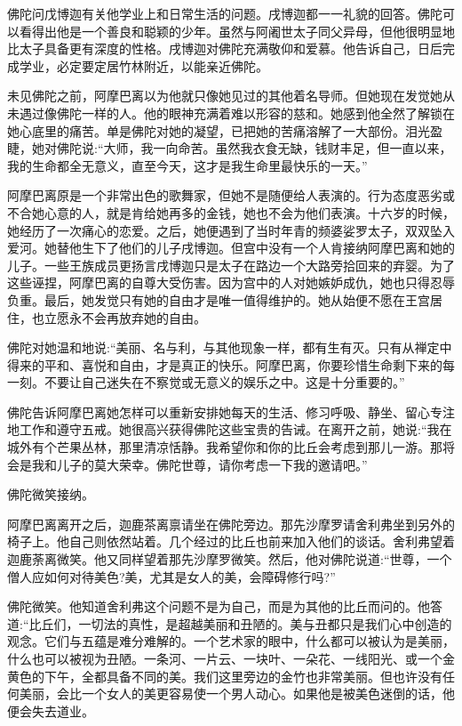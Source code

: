\documentclass[12pt,twoside,openany]{book}
\begin{document}
佛陀问戊博迦有关他学业上和日常生活的问题。戌博迦都一一礼貌的回答。佛陀可以看得出他是一个善良和聪颖的少年。虽然与阿阇世太子同父异母，但他很明显地比太子具备更有深度的性格。戌博迦对佛陀充满敬仰和爱慕。他告诉自己，日后完成学业，必定要定居竹林附近，以能亲近佛陀。

未见佛陀之前，阿摩巴离以为他就只像她见过的其他着名导师。但她现在发觉她从未遇过像佛陀一样的人。他的眼神充满着难以形容的慈和。她感到他全然了解锁在她心底里的痛苦。单是佛陀对她的凝望，已把她的苦痛溶解了一大部份。泪光盈睫，她对佛陀说:“大师，我一向命苦。虽然我衣食无缺，钱财丰足，但一直以来，我的生命都全无意义，直至今天，这才是我生命里最快乐的一天。”

阿摩巴离原是一个非常出色的歌舞家，但她不是随便给人表演的。行为态度恶劣或不合她心意的人，就是肯给她再多的金钱，她也不会为他们表演。十六岁的时候，她经历了一次痛心的恋爱。之后，她便遇到了当时年青的频婆娑罗太子，双双坠入爱河。她替他生下了他们的儿子戌博迦。但宫中没有一个人肯接纳阿摩巴离和她的儿子。一些王族成员更扬言戌博迦只是太子在路边一个大路旁拾回来的弃婴。为了这些诬捏，阿摩巴离的自尊大受伤害。因为宫中的人对她嫉妒成仇，她也只得忍辱负重。最后，她发觉只有她的自由才是唯一值得维护的。她从始便不愿在王宫居住，也立愿永不会再放弃她的自由。

佛陀对她温和地说:“美丽、名与利，与其他现象一样，都有生有灭。只有从禅定中得来的平和、喜悦和自由，才是真正的快乐。阿摩巴离，你要珍惜生命剩下来的每一刻。不要让自己迷失在不察觉或无意义的娱乐之中。这是十分重要的。”

佛陀告诉阿摩巴离她怎样可以重新安排她每天的生活、修习呼吸、静坐、留心专注地工作和遵守五戒。她很高兴获得佛陀这些宝贵的告诫。在离开之前，她说:“我在城外有个芒果丛林，那里清凉恬静。我希望你和你的比丘会考虑到那儿一游。那将会是我和儿子的莫大荣幸。佛陀世尊，请你考虑一下我的邀请吧。”

佛陀微笑接纳。

阿摩巴离离开之后，迦鹿茶离禀请坐在佛陀旁边。那先沙摩罗请舍利弗坐到另外的椅子上。他自己则依然站着。几个经过的比丘也前来加入他们的谈话。舍利弗望着迦鹿荼离微笑。他又同样望着那先沙摩罗微笑。然后，他对佛陀说道:“世尊，一个僧人应如何对待美色?美，尤其是女人的美，会障碍修行吗?”

佛陀微笑。他知道舍利弗这个问题不是为自己，而是为其他的比丘而问的。他答道:“比丘们，一切法的真性，是超越美丽和丑陋的。美与丑都只是我们心中创造的观念。它们与五蕴是难分难解的。一个艺术家的眼中，什么都可以被认为是美丽，什么也可以被视为丑陋。一条河、一片云、一块叶、一朵花、一线阳光、或一个金黄色的下午，全都具备不同的美。我们这里旁边的金竹也非常美丽。但也许没有任何美丽，会比一个女人的美更容易使一个男人动心。如果他是被美色迷倒的话，他便会失去道业。
\end{document}
